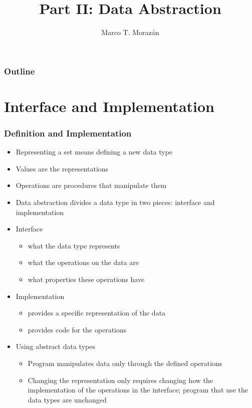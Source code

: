 \documentclass{beamer}
\begin{document}
\title{Part II: Data Abstraction}
\author{Marco T. Moraz\'{a}n}
\date{}

\begin{frame}
\titlepage
\end{frame}

\begin{frame}
\frametitle{Outline}
\tableofcontents
\end{frame}

\section{Interface and Implementation}

\begin{frame}[fragile]
\frametitle{Definition and Implementation}
\begin{scriptsize}
\begin{itemize}
\item<1-> Representing a set means defining a new data type

\item<2-> Values are the representations

\item<2-> Operations are procedures that manipulate them

\item<3-> Data abstraction divides a data type in two pieces: interface and implementation

\item<4-> Interface
\begin{itemize}
  \item what the data type represents
  \item what the operations on the data are
  \item what properties these operations have
\end{itemize}

\item<5-> Implementation
\begin{itemize}
  \item provides a specific representation of the data
  \item provides code for the operations
\end{itemize}

\item<6-> Using abstract data types
\begin{itemize}
  \item Program manipulates data only through the defined operations
  \item Changing the representation only requires changing how the implementation of the operations in the interface; program that use the data types are unchanged
\end{itemize}

\end{itemize}
\end{scriptsize}
\end{frame}
\end{document}
